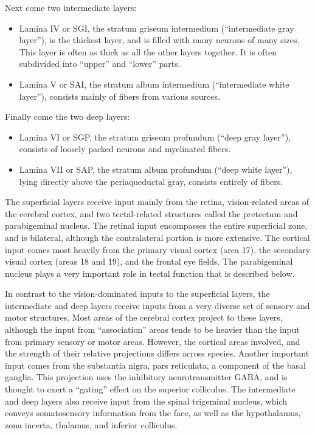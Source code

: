 Next come two intermediate layers:

\begin{itemize}
\tightlist
\item
  Lamina IV or SGI, the stratum griseum intermedium (``intermediate gray layer''), is the thickest layer, and is filled with many neurons of many sizes. This layer is often as thick as all the other layers together. It is often subdivided into ``upper'' and ``lower'' parts.
\item
  Lamina V or SAI, the stratum album intermedium (``intermediate white layer''), consists mainly of fibers from various sources.
\end{itemize}

Finally come the two deep layers:

\begin{itemize}
\tightlist
\item
  Lamina VI or SGP, the stratum griseum profundum (``deep gray layer''), consists of loosely packed neurons and myelinated fibers.
\item
  Lamina VII or SAP, the stratum album profundum (``deep white layer''), lying directly above the periaqueductal gray, consists entirely of fibers.
\end{itemize}

The superficial layers receive input mainly from the retina, vision-related areas of the cerebral cortex, and two tectal-related structures called the pretectum and parabigeminal nucleus. The retinal input encompasses the entire superficial zone, and is bilateral, although the contralateral portion is more extensive. The cortical input comes most heavily from the primary visual cortex (area 17), the secondary visual cortex (areas 18 and 19), and the frontal eye fields. The parabigeminal nucleus plays a very important role in tectal function that is described below.

In contrast to the vision-dominated inputs to the superficial layers, the intermediate and deep layers receive inputs from a very diverse set of sensory and motor structures. Most areas of the cerebral cortex project to these layers, although the input from ``association'' areas tends to be heavier than the input from primary sensory or motor areas. However, the cortical areas involved, and the strength of their relative projections differs across species. Another important input comes from the substantia nigra, pars reticulata, a component of the basal ganglia. This projection uses the inhibitory neurotransmitter GABA, and is thought to exert a ``gating'' effect on the superior colliculus. The intermediate and deep layers also receive input from the spinal trigeminal nucleus, which conveys somatosensory information from the face, as well as the hypothalamus, zona incerta, thalamus, and inferior colliculus.

